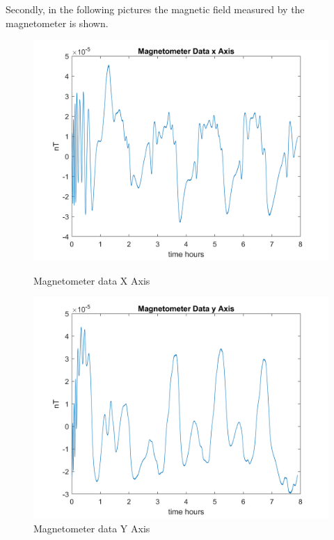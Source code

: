 \begin{itemize}
    Secondly, in the following pictures the magnetic field measured by the magnetometer is shown.
    \begin{figure}[H]
        \centering
        \begin{minipage}{0.32\linewidth}
            \centering
            \includegraphics[width=0.95\linewidth]{res/img/Nadir_no_EKF/Magnetometer data X Axis.png}
            \caption{Magnetometer data X Axis}
            \label{fig:MagnetometerDataX}
        \end{minipage}\hfill
        \begin{minipage}{0.32\linewidth}
            \centering
            \includegraphics[width=0.95\linewidth]{res/img/Nadir_no_EKF/Magnetometer data Y Axis.png}
            \caption{Magnetometer data Y Axis}
            \label{fig:MagnetometerDataY}

\end{minipage}
\end{figure}
\end{itemize}
